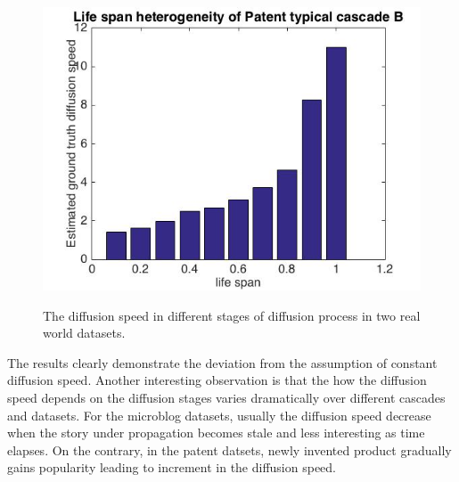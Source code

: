 \begin{figure}[h]
{{\includegraphics[width=0.55\linewidth]{figures/PatentB.jpg}}}
\caption{The diffusion speed in different stages of diffusion process in two real world datasets. }\label{fig:PatentHetero}
\end{figure}

The results clearly demonstrate the deviation from the assumption of constant diffusion speed. Another interesting observation is that the how the diffusion speed depends on the diffusion stages varies dramatically over different cascades and datasets. For the microblog datasets, usually the diffusion speed decrease when the story under propagation becomes stale and less interesting as time elapses. On the contrary, in the patent datsets, newly invented product gradually gains popularity leading to increment in the diffusion speed. 



